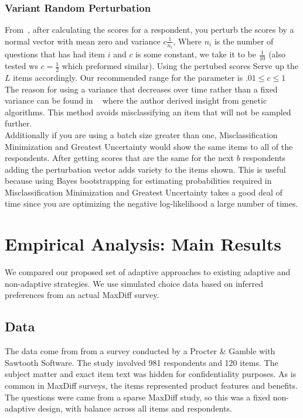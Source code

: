 \documentclass[a4paper,12pt]{article}
\newcommand{\numperset}{L}
\begin{document}
\subsubsection{Variant Random Perturbation}
From~\cite{toubia2007adaptive}, after calculating the scores for a respondent, you perturb the scores by a normal vector with mean zero and variance $c\frac{1}{n_i}$, Where $n_i$ is the number of questions that has had item $i$ and $c$ is some constant, we take it to be $\frac{1}{10}$ (also tested ws $c=\frac{1}{2}$ which preformed similar). Using the pertubed scores Serve up the $\numperset$ items accordingly. Our recommended range for the parameter is $.01 \leq c \leq 1$\\
The reason for using a variance that decreases over time rather than a fixed variance can be found in ~\cite{toubia2007adaptive} where the author derived insight from genetic algorithms. This method avoids misclassifying an item that will not be sampled further.\\
Additionally if you are using a batch size greater than one, Misclassification Minimization and Greatest Uncertainty would show the same items to all of the respondents. After getting scores that are the same for the next $b$ respondents adding the perturbation vector adds variety to the items shown. This is useful because using Bayes bootstrapping for estimating probabilities required in Misclassification Minimization and Greatest Uncertainty takes a good deal of time since you are optimizing the negative log-likelihood a large number of times.








\section{Empirical Analysis: Main Results}

\label{sec:empirical_main}
We compared our proposed set of adaptive approaches to existing adaptive and non-adaptive strategies. We use simulated choice data based on inferred preferences from an actual MaxDiff survey.

\subsection{Data}
The data come from from a survey conducted by a Procter \& Gamble with Sawtooth Software. The study involved 981 respondents and 120 items. The subject matter and exact item text was hidden for confidentiality purposes. As is common in MaxDiff surveys, the items represented product features and benefits. The questions were came from a sparse MaxDiff study, so this was a fixed non-adaptive design, with balance across all items and respondents. 
\end{document}
